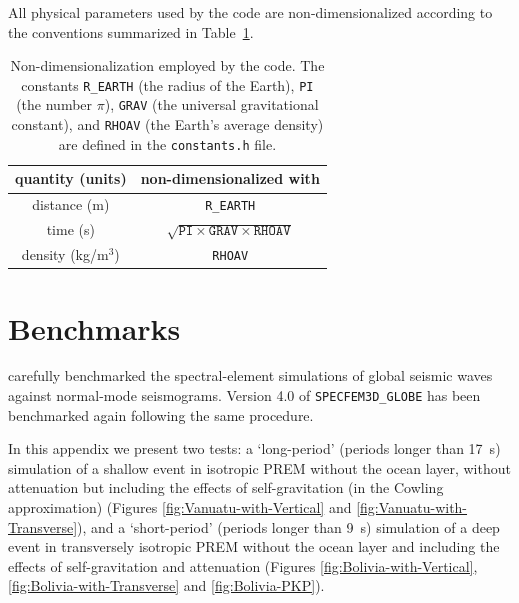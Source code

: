 \documentclass[oneside,english]{book}
\providecommand{\tabularnewline}{\\}
\begin{document}
All physical parameters used by the code are non-dimensionalized according
to the conventions summarized in Table~{\small \ref{table:conventions}.
}%
\begin{table}[ht]
\noindent \begin{centering}
{\small }\begin{tabular}{|c|c|}
\hline
quantity (units)  & non-dimensionalized with \tabularnewline
\hline
distance (m)  & \texttt{R\_EARTH} \tabularnewline
time (s)  & $\sqrt{\texttt{PI}\times\texttt{GRAV}\times\texttt{RHOAV}}$ \tabularnewline
density (kg/m$^{3}$)  & \texttt{RHOAV} \tabularnewline
\hline
\end{tabular}
\par\end{centering}{\small \par}

\caption{Non-dimensionalization employed by the code. The constants \texttt{R\_EARTH}
(the radius of the Earth), \texttt{PI} (the number $\pi$), \texttt{GRAV}
(the universal gravitational constant), and \texttt{RHOAV} (the Earth's
average density) are defined in the \texttt{constants.h} file. }


{\small \label{table:conventions} }
\end{table}
{\small \par}


\chapter{Benchmarks}

\citet{KoTr02a,KoTr02b} carefully benchmarked the spectral-element
simulations of global seismic waves against normal-mode seismograms.
Version 4.0 of \texttt{SPECFEM3D\_GLOBE} has been benchmarked again
following the same procedure.

In this appendix we present two tests: a `long-period' (periods longer
than 17~s) simulation of a shallow event in isotropic PREM \citep{DzAn81}
without the ocean layer, without attenuation but including the effects
of self-gravitation (in the Cowling approximation) (Figures \ref{fig:Vanuatu-with-Vertical}
and \ref{fig:Vanuatu-with-Transverse}), and a `short-period' (periods
longer than 9~s) simulation of a deep event in transversely isotropic
PREM without the ocean layer and including the effects of self-gravitation
and attenuation (Figures \ref{fig:Bolivia-with-Vertical}, \ref{fig:Bolivia-with-Transverse}
and \ref{fig:Bolivia-PKP}).
\end{document}
